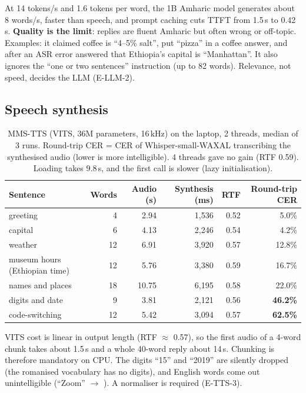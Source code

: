 \begin{finding}
At 14 tokens/s and 1.6 tokens per word, the 1B Amharic model generates about 8 words/s, faster than
speech, and prompt caching cuts TTFT from 1.5\,s to 0.42\,s. \textbf{Quality is the limit}: replies are
fluent Amharic but often wrong or off-topic. Examples: it claimed coffee is ``4--5\% salt'', put
``pizza'' in a coffee answer, and after an ASR error answered that Ethiopia's capital is ``Manhattan''.
It also ignores the ``one or two sentences'' instruction (up to 82 words). Relevance, not speed,
decides the LLM (E-LLM-2).
\end{finding}

\subsection{Speech synthesis}
\label{sec:m-tts}
\begin{table}[H]
\centering\small
\begin{tabular}{@{}lrrrrr@{}}
\toprule
\textbf{Sentence} & \textbf{Words} & \textbf{Audio (s)} & \textbf{Synthesis (ms)} & \textbf{RTF} & \textbf{Round-trip CER} \\
\midrule
greeting & 4 & 2.94 & 1{,}536 & 0.52 & 5.0\% \\
capital & 6 & 4.13 & 2{,}246 & 0.54 & 4.2\% \\
weather & 12 & 6.91 & 3{,}920 & 0.57 & 12.8\% \\
museum hours (Ethiopian time) & 12 & 5.76 & 3{,}380 & 0.59 & 16.7\% \\
names and places & 18 & 10.75 & 6{,}195 & 0.58 & 22.0\% \\
digits and date & 9 & 3.81 & 2{,}121 & 0.56 & \textcolor{bad}{\textbf{46.2\%}} \\
code-switching & 12 & 5.42 & 3{,}094 & 0.57 & \textcolor{bad}{\textbf{62.5\%}} \\
\bottomrule
\end{tabular}
\caption{MMS-TTS (VITS, 36M parameters, 16\,kHz) on the laptop, 2 threads, median of 3 runs\meas. Round-trip
CER = CER of Whisper-small-WAXAL transcribing the synthesised audio (lower is more intelligible). 4 threads
gave no gain (RTF 0.59). Loading takes 9.8\,s, and the first call is slower (lazy initialisation).}
\label{tab:tts-meas}
\end{table}

\begin{finding}
VITS cost is linear in output length (RTF $\approx$ 0.57), so the first audio of a 4-word chunk takes
about 1.5\,s and a whole 40-word reply about 14\,s. Chunking is therefore mandatory on CPU. The digits
``15'' and ``2019'' are silently dropped (the romanised vocabulary has no digits), and English words
come out unintelligible (``Zoom'' $\rightarrow$ ). A normaliser is required (E-TTS-3).
\end{finding}

